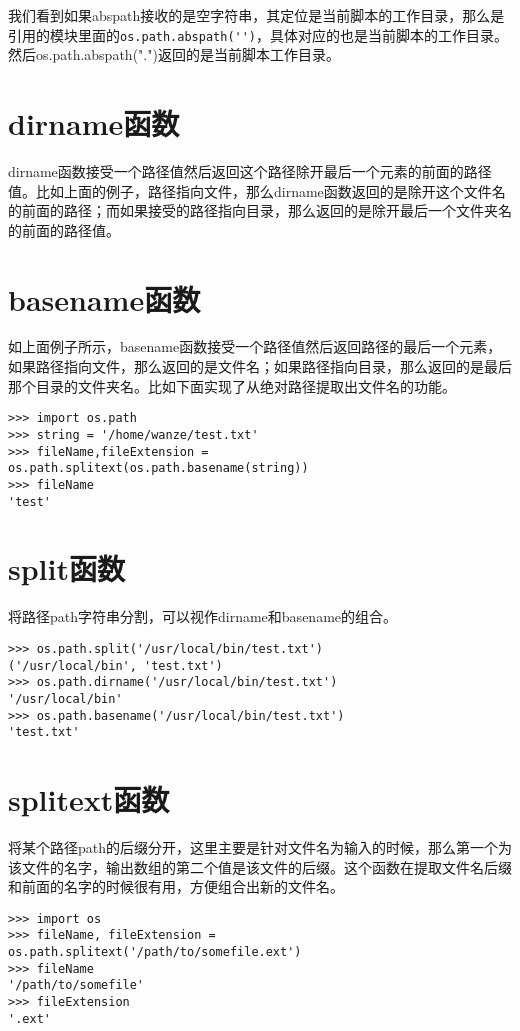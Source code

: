 \documentclass[12pt,oneside]{book}
\begin{document}
\begin{common-format}
我们看到如果abspath接收的是空字符串，其定位是当前脚本的工作目录，那么是引用的模块里面的\verb+os.path.abspath('')+，具体对应的也是当前脚本的工作目录。然后os.path.abspath(".")返回的是当前脚本工作目录。


\section{dirname函数}
dirname函数接受一个路径值然后返回这个路径除开最后一个元素的前面的路径值。比如上面的例子，路径指向文件，那么dirname函数返回的是除开这个文件名的前面的路径；而如果接受的路径指向目录，那么返回的是除开最后一个文件夹名的前面的路径值。

\section{basename函数}
如上面例子所示，basename函数接受一个路径值然后返回路径的最后一个元素，如果路径指向文件，那么返回的是文件名；如果路径指向目录，那么返回的是最后那个目录的文件夹名。比如下面实现了从绝对路径提取出文件名的功能。
\begin{Verbatim}
>>> import os.path
>>> string = '/home/wanze/test.txt'
>>> fileName,fileExtension = os.path.splitext(os.path.basename(string))
>>> fileName
'test'
\end{Verbatim}




\section{split函数}
将路径path字符串分割，可以视作dirname和basename的组合。
\begin{Verbatim}
>>> os.path.split('/usr/local/bin/test.txt')
('/usr/local/bin', 'test.txt')
>>> os.path.dirname('/usr/local/bin/test.txt')
'/usr/local/bin'
>>> os.path.basename('/usr/local/bin/test.txt')
'test.txt'
\end{Verbatim}



\section{splitext函数}
将某个路径path的后缀分开，这里主要是针对文件名为输入的时候，那么第一个为该文件的名字，输出数组的第二个值是该文件的后缀。这个函数在提取文件名后缀和前面的名字的时候很有用，方便组合出新的文件名。
\begin{Verbatim}
>>> import os
>>> fileName, fileExtension = os.path.splitext('/path/to/somefile.ext')
>>> fileName
'/path/to/somefile'
>>> fileExtension
'.ext'
\end{Verbatim}



\end{common-format}
\end{document}
